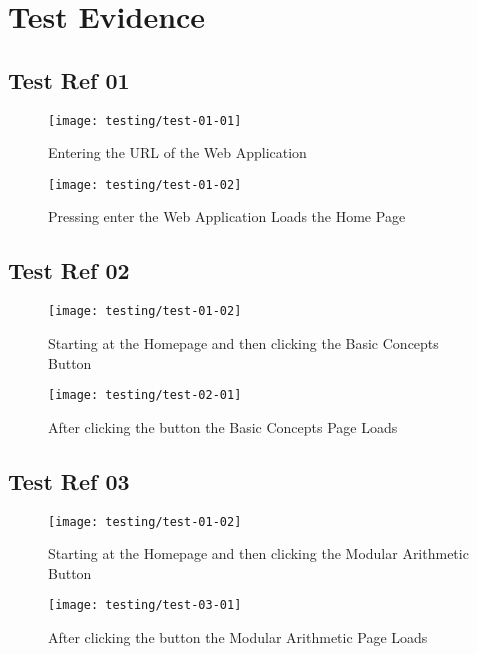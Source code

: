 \section{Test Evidence}

\subsection{Test Ref 01}

\begin{figure}[H]
\centering
\texttt{[image: testing/test-01-01]}
\caption{Entering the URL of the Web Application}
\label{test-01-01}
\end{figure}

\begin{figure}[H]
\centering
\texttt{[image: testing/test-01-02]}
\caption{Pressing enter the Web Application Loads the Home Page}
\label{test-01-02}
\end{figure}

\subsection{Test Ref 02}

\begin{figure}[H]
\centering
\texttt{[image: testing/test-01-02]}
\caption{Starting at the Homepage and then clicking the Basic Concepts Button}
\label{test-02-01}
\end{figure}

\begin{figure}[H]
\centering
\texttt{[image: testing/test-02-01]}
\caption{After clicking the button the Basic Concepts Page Loads}
\label{test-02-02}
\end{figure}

\subsection{Test Ref 03}

\begin{figure}[H]
\centering
\texttt{[image: testing/test-01-02]}
\caption{Starting at the Homepage and then clicking the Modular Arithmetic Button}
\label{test-03-01}
\end{figure}

\begin{figure}[H]
\centering
\texttt{[image: testing/test-03-01]}
\caption{After clicking the button the Modular Arithmetic Page Loads}
\label{test-03-02}
\end{figure}

